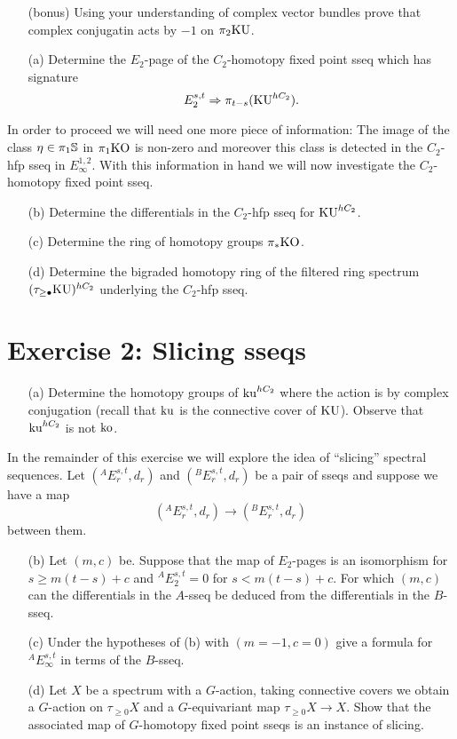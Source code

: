 \documentclass[reqno]{amsart}
\begin{document}
\begin{itemize}
\item[(bonus)] Using your understanding of complex vector bundles prove that
  complex conjugatin acts by $-1$ on $\pi_2\mathrm{KU}$.
\item[(a)] Determine the $E_2$-page of the $C_2$-homotopy fixed point sseq which has signature
  \[ E_2^{s,t} \Rightarrow \pi_{t-s}(\mathrm{KU}^{hC_2}). \]
\end{itemize}

In order to proceed we will need one more piece of information:
The image of the class $\eta \in \pi_1\mathbb{S}$ in $\pi_1\mathrm{KO}$ is non-zero and
moreover this class is detected in the $C_2$-hfp sseq in $E_\infty^{1,2}$.
With this information in hand we will now investigate the $C_2$-homotopy fixed point sseq.

\begin{itemize}
\item[(b)] Determine the differentials in the $C_2$-hfp sseq for $\mathrm{KU}^{hC_2}$.
\item[(c)] Determine the ring of homotopy groups $\pi_*\mathrm{KO}$.
\item[(d)] Determine the bigraded homotopy ring of the filtered ring spectrum
  $(\tau_{\geq \bullet} \mathrm{KU})^{hC_2}$ underlying the $C_2$-hfp sseq.
\end{itemize}

\section{\bf Exercise 2: Slicing sseqs}

\begin{itemize}
\item[(a)] Determine the homotopy groups of $\mathrm{ku}^{hC_2}$ where the action is by complex conjugation (recall that $\mathrm{ku}$ is the connective cover of $\mathrm{KU}$). Observe that $\mathrm{ku}^{hC_2}$ is not $\mathrm{ko}$.
\end{itemize}

In the remainder of this exercise we will explore the idea of ``slicing'' spectral sequences.
Let $\left( {}^AE_r^{s,t}, d_r \right)$ and $\left( {}^BE_r^{s,t}, d_r \right)$
be a pair of sseqs and suppose we have a  map
\[ \left( {}^AE_r^{s,t}, d_r \right) \to \left( {}^BE_r^{s,t}, d_r \right) \]
between them.

\begin{itemize}
\item[(b)] Let $(m,c)$ be.
  Suppose that the map of $E_2$-pages is an isomorphism
  for $s \geq m(t-s) + c$ and
  ${}^A E_2^{s,t} = 0$ for $s < m(t-s) + c$.
  For which $(m,c)$ can the differentials in the $A$-sseq be deduced from the
  differentials in the $B$-sseq.
\item[(c)] Under the hypotheses of (b)
  with $(m=-1,c=0)$ give a formula for ${}^AE_\infty^{s,t}$ in terms of the $B$-sseq.
\item[(d)] Let $X$ be a spectrum with a $G$-action, taking connective covers we
  obtain a $G$-action on $\tau_{\geq 0}X$ and a $G$-equivariant map $\tau_{\geq 0}X \to X$.
  Show that the associated map of $G$-homotopy fixed point sseqs
  is an instance of slicing.
\end{itemize}
\end{document}
